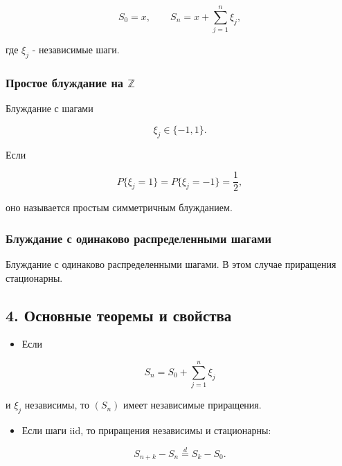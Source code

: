 \documentclass[
  11pt,
  a4paper,
]{article}
\providecommand{\tightlist}{%
  \setlength{\itemsep}{0pt}\setlength{\parskip}{0pt}}
\begin{document}
\[
S_0=x,
\qquad
S_n=x+\sum_{j=1}^n\xi_j,
\]

где \(\xi_j\) - независимые шаги.

\subsubsection{\texorpdfstring{Простое блуждание на
\(\mathbb Z\)}{Простое блуждание на \textbackslash mathbb Z}}\label{ux43fux440ux43eux441ux442ux43eux435-ux431ux43bux443ux436ux434ux430ux43dux438ux435-ux43dux430-mathbb-z}

Блуждание с шагами

\[
\xi_j\in\{-1,1\}.
\]

Если

\[
P\{\xi_j=1\}=P\{\xi_j=-1\}=\frac12,
\]

оно называется простым симметричным блужданием.

\subsubsection{Блуждание с одинаково распределенными
шагами}\label{ux431ux43bux443ux436ux434ux430ux43dux438ux435-ux441-ux43eux434ux438ux43dux430ux43aux43eux432ux43e-ux440ux430ux441ux43fux440ux435ux434ux435ux43bux435ux43dux43dux44bux43cux438-ux448ux430ux433ux430ux43cux438}

Блуждание с одинаково распределенными шагами. В этом случае приращения
стационарны.

\subsection{4. Основные теоремы и
свойства}\label{ux43eux441ux43dux43eux432ux43dux44bux435-ux442ux435ux43eux440ux435ux43cux44b-ux438-ux441ux432ux43eux439ux441ux442ux432ux430}

\begin{itemize}
\tightlist
\item
  Если
\end{itemize}

\[
S_n=S_0+\sum_{j=1}^n\xi_j
\]

и \(\xi_j\) независимы, то \((S_n)\) имеет независимые приращения.

\begin{itemize}
\tightlist
\item
  Если шаги iid, то приращения независимы и стационарны:
\end{itemize}

\[
S_{n+k}-S_n\stackrel d=S_k-S_0.
\]
\end{document}
